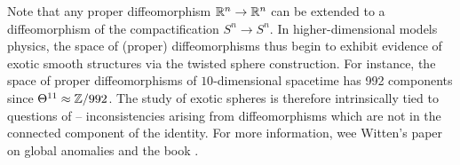 	Note that any proper diffeomorphism $\mathbb{R}^n \to \mathbb{R}^n$ can be extended to a diffeomorphism of the compactification $S^{n} \to S^n$. In higher-dimensional models physics, the space of (proper) diffeomorphisms thus begin to exhibit evidence of exotic smooth structures via the twisted sphere construction. For instance, the space of proper diffeomorphisms of $10$-dimensional spacetime has 992 components since $\Theta^{11}\approx \mathbb{Z}/992$. The study of exotic spheres is therefore intrinsically tied to questions of  -- inconsistencies arising from diffeomorphisms which are not in the connected component of the identity. For more information, wee Witten's paper \cite{witten1985anomalies} on global anomalies and the book \cite{baadhio1996quantum}.
	\smallrule
